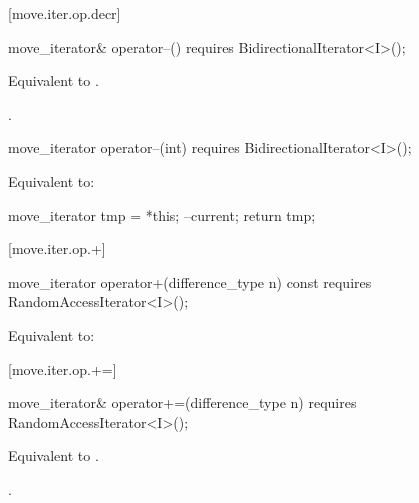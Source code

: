 [move.iter.op.decr]{}

%
%
\begin{itemdecl}
move_iterator& operator--()
  requires BidirectionalIterator<I>();
\end{itemdecl}

\begin{itemdescr}
\pnum
\effects Equivalent to .

\pnum
\returns {}.
\end{itemdescr}

%
%
\begin{itemdecl}
move_iterator operator--(int)
  requires BidirectionalIterator<I>();
\end{itemdecl}

\begin{itemdescr}
\pnum
\effects Equivalent to:
\begin{codeblock}
move_iterator tmp = *this;
--current;
return tmp;
\end{codeblock}
\end{itemdescr}

[move.iter.op.+]{}

%
%
\begin{itemdecl}
move_iterator operator+(difference_type n) const
  requires RandomAccessIterator<I>();
\end{itemdecl}

\begin{itemdescr}
\pnum
\effects Equivalent to:
\end{itemdescr}

[move.iter.op.+=]{}

%
%
\begin{itemdecl}
move_iterator& operator+=(difference_type n)
  requires RandomAccessIterator<I>();
\end{itemdecl}

\begin{itemdescr}
\pnum
\effects Equivalent to .

\pnum
\returns {}.
\end{itemdescr}

